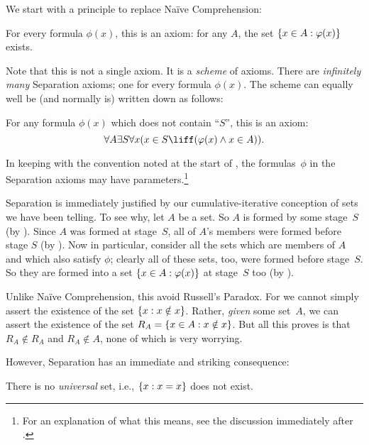 \documentclass[../../../include/open-logic-section]{subfiles}
\begin{document}

We start with a principle to replace Na\"{i}ve Comprehension:

\begin{axiom} For every formula $\phi(x)$, this is an
axiom: for any $A$, the set $\{ x \in A : \varphi(x) \}$ exists.
\end{axiom}

Note that this is not a single axiom. It is a \emph{scheme} of axioms.
There are \emph{infinitely many} Separation axioms; one for every
formula $\phi(x)$. The scheme can equally well be (and normally is)
written down as follows:

\begin{defish}
For any formula $\phi(x)$ which does not contain ``$S$'', this is an
axiom:
\[
	\forall A \exists S \forall x(x \in S \liff (\phi(x) \land x \in A)).
\]
\end{defish}

In keeping with the convention noted at the start of
, the formulas~$\phi$ in the Separation axioms
may have parameters.\footnote{For an explanation of what this means,
see the discussion immediately after
.}

Separation is immediately justified by our cumulative-iterative
conception of sets we have been telling. To see why, let $A$ be a set.
So $A$ is formed by some stage~$S$ (by \stageshier). Since $A$ was
formed at stage~$S$, all of $A$'s members were formed before stage $S$
(by \stagesacc). Now in particular, consider all the sets which are
members of $A$ and which also satisfy $\phi$; clearly all of these
sets, too, were formed before stage~$S$. So they are formed into a set
$\{ x \in A : \varphi(x) \}$ at stage~$S$ too (by \stagesacc).

Unlike Na\"ive Comprehension, this avoid Russell's Paradox. For we
cannot simply assert the existence of the set $\{ x : x \notin
x \}$. Rather, \emph{given} some set~$A$, we can assert the existence of
the set $R_A = \{ x \in A : x \notin x \}$. But all this proves is
that $R_A \notin R_A$ and $R_A \notin A$, none of which is very
worrying.

However, Separation has an immediate and striking consequence:

\begin{thm}
There is no \emph{universal} set, i.e., $\{ x : x = x \}$ does not exist.
\end{thm}
\end{document}
